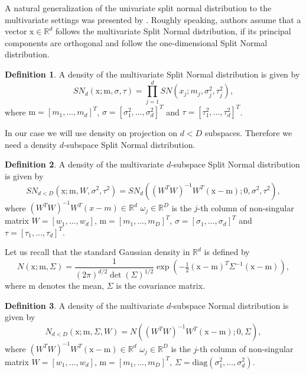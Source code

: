 \documentclass[12pt]{article}
\def\R{\mathbb{R}}
\def\w{\omega}
\def\x{\mathrm{x}}
\def\m{\mathrm{m}}
\def\diag{\mathrm{diag}}
\theoremstyle{definition}
\newtheorem{definition}{Definition}[section]
\begin{document}
A natural generalization of the univariate split normal distribution to the multivariate settings was presented by \cite{villani2006multivariate}.
Roughly speaking, authors assume that a vector $\x \in \R^d$ follows the multivariate Split Normal distribution, if its principal components are orthogonal and follow the one-dimensional Split Normal distribution.

\begin{definition}\label{def:SN}
A density of the multivariate Split Normal distribution is given by
$$
 SN_{d}(\x; \m, \sigma,\tau)= \prod_{j=1}^{d} SN(x_j;m_j,\sigma_j^2,\tau_j^2),
$$
where  $\m = [m_1, \ldots, m_d]^T$, $\sigma = [\sigma_{1}^2,\ldots,\sigma_{d}^2]^T$ and $\tau=[\tau_{1}^2,\ldots,\tau_{d}^2]^T$.
\end{definition}


In our case we will use density on projection on $d<D$ subspaces. Therefore we need a density $d$-subspace Split Normal distribution.

\begin{definition}\label{def:GSN}
A density of the multivariate $d$-subspace Split Normal distribution is given by
$$
 SN_{d<D}(\x; \m,W, \sigma^2,\tau^2)=  SN_d((W^TW)^{-1}W^T(\x-\m);0,\sigma^2,\tau^2),
$$
where
$(W^TW)^{-1}W^T(x-m) \in \R^d$
 $\w_{j} \in \R^D$ is the $j$-th column of non-singular matrix $W = [w_{1},\ldots,w_{d}]$, $\m = [m_1, \ldots, m_D]^T$, $\sigma = [\sigma_{1},\ldots,\sigma_{d}]^T$ and $\tau=[\tau_{1},\ldots,\tau_{d}]^T$.
\end{definition}

Let us recall that the standard Gaussian density in $\R^d$ is defined by 
$$
N(\x;\m,\Sigma)=\frac{1}{(2\pi)^{d/2} \det(\Sigma)^{1/2}} \exp \left(-\tfrac{1}{2} (\x-\m)^T \Sigma^{-1}(\x-\m) \right),
$$
where $\m$ denotes the mean, $\Sigma$ is the covariance matrix.

\begin{definition}\label{def:GSN}
A density of the multivariate $d$-subspace Normal distribution is given by
$$
 N_{d<D}(\x; \m, \Sigma, W)= N((W^TW)^{-1}W^T(\x-\m);0,\Sigma),
$$
where
$(W^TW)^{-1}W^T(\x-\m) \in \R^d$
 $\w_{j} \in \R^D$ is the $j$-th column of non-singular matrix $W = [w_{1},\ldots,w_{d}]$, $\m = [m_1, \ldots, m_D]^T$, $\Sigma = \diag(\sigma_{1}^2,\ldots,\sigma_{d}^2)$.
\end{definition}
\end{document}
